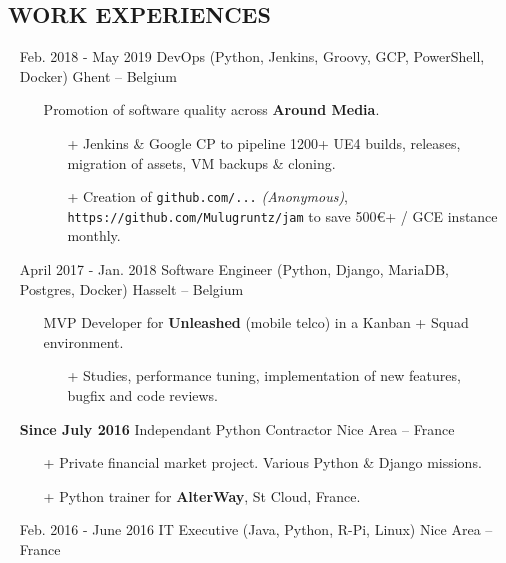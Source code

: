 \documentclass{res}
\begin{document}
\begin{resume}
\pagebreak

\section{\faBriefcase~WORK EXPERIENCES}
        \begin{itemize}
					\item[] Feb.  2018 - May 2019 \tabto{5cm} DevOps (Python, Jenkins, Groovy, GCP, PowerShell, Docker) \hfill Ghent -- Belgium
					\begin{itemize}
                        \item[] Promotion of software quality across \textbf{Around Media}.
                        \begin{itemize}
                            \item[+] Jenkins \& Google CP to pipeline 1200+ UE4 builds, releases, migration of assets, VM backups \& cloning.
                            \item[+] Creation of \ifisanon \texttt{github.com/...} \textit{(Anonymous)}, \else \texttt{https://github.com/Mulugruntz/jam} \fi to save 500\euro+ / GCE instance monthly.
                        \end{itemize}
					\end{itemize}
					\item[] April 2017 - Jan. 2018 \tabto{5cm} Software Engineer (Python, Django, MariaDB, Postgres, Docker) \hfill Hasselt -- Belgium
					\begin{itemize}
						\item[] MVP Developer for  \textbf{Unleashed} (mobile telco) in a Kanban + Squad environment.
						\begin{itemize}
							\item[+] Studies, performance tuning, implementation of new features, bugfix and code reviews.
						\end{itemize}
					\end{itemize}
					\item[] \textbf{Since July 2016} \tabto{5cm} Independant Python Contractor \hfill Nice Area -- France
					\begin{itemize}
						\item[+] Private financial market project. Various Python \& Django missions.
						\item[+] Python trainer for \textbf{AlterWay}, St Cloud, France.
					\end{itemize}
					\item[] Feb. 2016 - June 2016 \tabto{5cm} IT Executive (Java, Python, R-Pi, Linux) \hfill Nice Area -- France

\end{itemize}
\end{resume}
\end{document}
